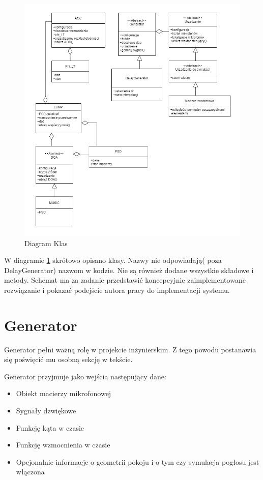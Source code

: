 \begin{figure}[h!]
    \centering
    \includegraphics[width=\textwidth]{Images/uml_pl.png}
    \caption{Diagram Klas}
    \label{fig:classes}
\end{figure}


\noindent W diagramie \ref{fig:classes} skrótowo opisano klasy. Nazwy nie odpowiadają( poza DelayGenerator) nazwom w kodzie. Nie są również dodane wszystkie składowe i metody. Schemat ma za zadanie przedstawić koncepcyjnie zaimplementowane rozwiązanie i pokazać podejście autora pracy do implementacji systemu.


\newpage

\section{Generator}

Generator pełni ważną rolę w projekcie inżynierskim. Z tego powodu postanawia się poświęcić mu osobną sekcję w tekście. 

\noindent Generator przyjmuje jako wejścia następujący dane:

\begin{itemize}
    \item Obiekt macierzy mikrofonowej
    \item Sygnały dzwiękowe 
    \item Funkcję kąta w czasie
    \item Funkcję wzmocnienia w czasie
    \item Opcjonalnie informacje o geometrii pokoju i o tym czy symulacja pogłosu jest włączona
\end{itemize}

